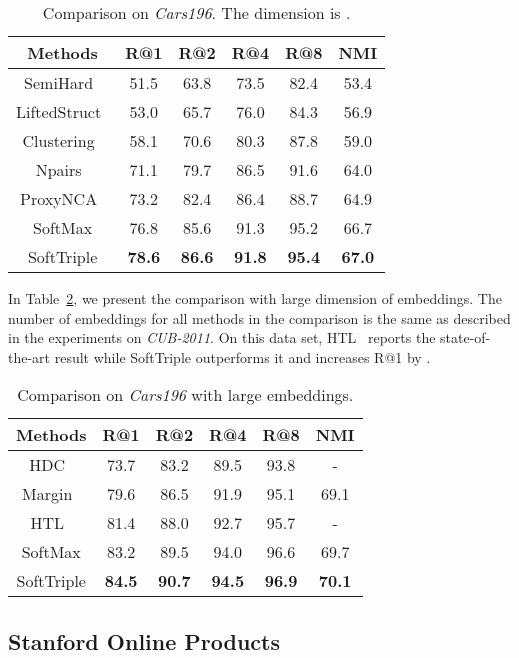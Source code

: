 \documentclass[10pt,twocolumn,letterpaper]{article}
\begin{document}
\begin{table}[!ht]
\centering
\small
\caption{Comparison on \textit{Cars196}. The dimension is .}\label{ta:cars64}
\begin{tabular}{c|ccccc}
Methods&R@1&R@2&R@4&R@8&NMI\\\hline
SemiHard~\cite{SchroffKP15}&51.5&63.8&73.5&82.4&53.4\\
LiftedStruct~\cite{SongXJS16}&53.0&65.7&76.0&84.3&56.9\\
Clustering~\cite{SongJR017}&58.1&70.6&80.3&87.8&59.0\\
Npairs~\cite{Sohn16}&71.1&79.7&86.5&91.6&64.0\\
ProxyNCA~\cite{Attias17}&73.2&82.4&86.4&88.7&64.9\\\hline
SoftMax&76.8&85.6&91.3&95.2&66.7\\
SoftTriple&\textbf{78.6}&\textbf{86.6}&\textbf{91.8}&\textbf{95.4}&\textbf{67.0}\\
\end{tabular}
\end{table}

In Table~\ref{ta:cars512}, we present the comparison with large dimension of embeddings. The number of embeddings for all methods in the comparison is the same as described in the experiments on \textit{CUB-2011}. On this data set, HTL~\cite{GeHDS18} reports the state-of-the-art result while SoftTriple outperforms it and increases R@1 by . 

\begin{table}[!ht]
\centering
\small
\caption{Comparison on \textit{Cars196} with large embeddings.}\label{ta:cars512}
\begin{tabular}{c|ccccc}
Methods&R@1&R@2&R@4&R@8&NMI\\\hline
HDC~\cite{YuanYZ17}&73.7&83.2&89.5&93.8&-\\
Margin~\cite{ManmathaWSK17}&79.6&86.5&91.9&95.1&69.1\\
HTL~\cite{GeHDS18}&81.4&88.0&92.7&95.7&-\\\hline
SoftMax&83.2&89.5&94.0&96.6&69.7\\
SoftTriple&\textbf{84.5}&\textbf{90.7}&\textbf{94.5}&\textbf{96.9}&\textbf{70.1}\\
\end{tabular}
\end{table}

\subsection{Stanford Online Products}
\end{document}
